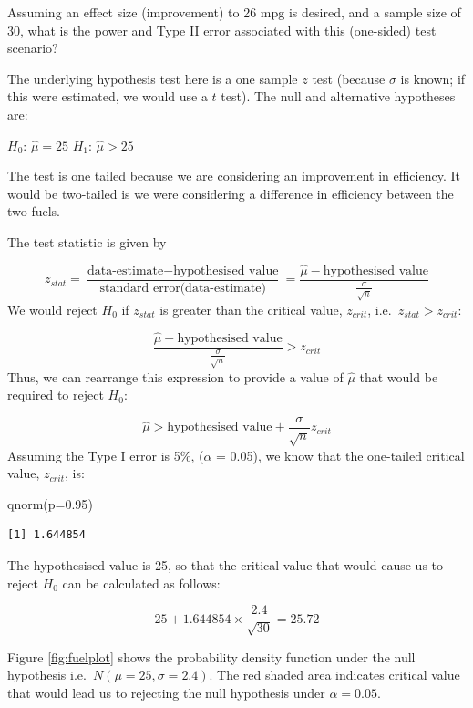 \documentclass[
  oneside]{krantz}
\newenvironment{Shaded}{\begin{snugshade}}{\end{snugshade}}
\newcommand{\AttributeTok}[1]{\textcolor[rgb]{0.77,0.63,0.00}{#1}}
\newcommand{\FloatTok}[1]{\textcolor[rgb]{0.00,0.00,0.81}{#1}}
\newcommand{\FunctionTok}[1]{\textcolor[rgb]{0.00,0.00,0.00}{#1}}
\newcommand{\NormalTok}[1]{#1}
\begin{document}
Assuming an effect size (improvement) to 26 mpg is desired, and a sample size of 30, what is the power and Type II error associated with this (one-sided) test scenario?

The underlying hypothesis test here is a one sample \(z\) test (because \(\sigma\) is known; if this were estimated, we would use a \(t\) test). The null and alternative hypotheses are:

\(H_0\): \(\hat \mu = 25\)
\(H_1\): \(\hat \mu > 25\)

The test is one tailed because we are considering an improvement in efficiency. It would be two-tailed is we were considering a difference in efficiency between the two fuels.

The test statistic is given by

\[ z_{stat} = \frac{\textrm{data-estimate} - \textrm{hypothesised value}}{\textrm{standard error(data-estimate)}} = \frac{\hat \mu - \textrm{hypothesised value}}{\frac{\sigma}{\sqrt{n}}}\]
We would reject \(H_0\) if \(z_{stat}\) is greater than the critical value, \(z_{crit}\), i.e.~\(z_{stat} > z_{crit}\):

\[ \frac{\hat \mu - \textrm{hypothesised value}}{\frac{\sigma}{\sqrt{n}}} > z_{crit}\]
Thus, we can rearrange this expression to provide a value of \(\hat \mu\) that would be required to reject \(H_0\):

\[\hat \mu > \textrm{hypothesised value} + \frac{\sigma}{\sqrt{n}}z_{crit}\]
Assuming the Type I error is 5\%, (\(\alpha\) = 0.05), we know that the one-tailed critical value, \(z_{crit}\), is:

\begin{Shaded}
\begin{Highlighting}[]
\FunctionTok{qnorm}\NormalTok{(}\AttributeTok{p=}\FloatTok{0.95}\NormalTok{)}
\end{Highlighting}
\end{Shaded}

\begin{verbatim}
[1] 1.644854
\end{verbatim}

The hypothesised value is 25, so that the critical value that would cause us to reject \(H_0\) can be calculated as follows:

\[25 + 1.644854 \times \frac{2.4}{\sqrt{30}} = 25.72\]

Figure \ref{fig:fuelplot} shows the probability density function under the null hypothesis i.e.~\(N(\mu=25, \sigma=2.4)\). The red shaded area indicates critical value that would lead us to rejecting the null hypothesis under \(\alpha = 0.05\).
\end{document}
